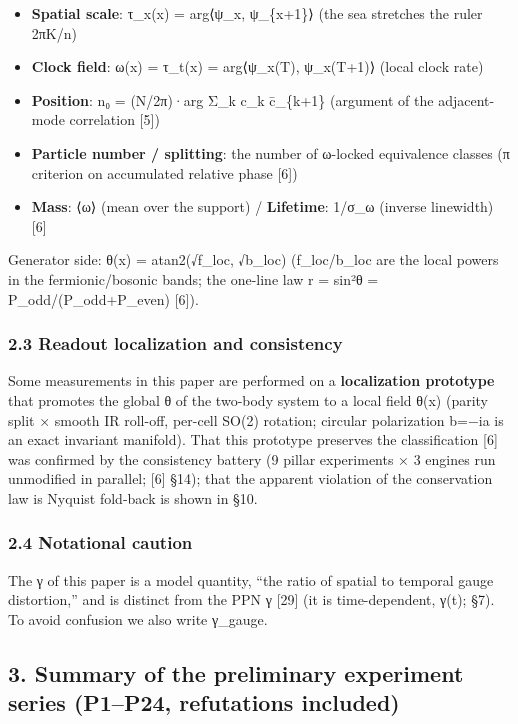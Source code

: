 \documentclass[
]{article}
\providecommand{\tightlist}{%
  \setlength{\itemsep}{0pt}\setlength{\parskip}{0pt}}
\begin{document}
\begin{itemize}
\tightlist
\item
  \textbf{Spatial scale}: τ\_x(x) = arg⟨ψ\_x, ψ\_\{x+1\}⟩ (the sea
  stretches the ruler 2πK/n)
\item
  \textbf{Clock field}: ω(x) = τ\_t(x) = arg⟨ψ\_x(T), ψ\_x(T+1)⟩ (local
  clock rate)
\item
  \textbf{Position}: n₀ = (N/2π)·arg Σ\_k c\_k c̄\_\{k+1\} (argument of
  the adjacent-mode correlation {[}5{]})
\item
  \textbf{Particle number / splitting}: the number of ω-locked
  equivalence classes (π criterion on accumulated relative phase
  {[}6{]})
\item
  \textbf{Mass}: ⟨ω⟩ (mean over the support) / \textbf{Lifetime}: 1/σ\_ω
  (inverse linewidth) {[}6{]}
\end{itemize}

Generator side: θ(x) = atan2(√f\_loc, √b\_loc) (f\_loc/b\_loc are the
local powers in the fermionic/bosonic bands; the one-line law r = sin²θ
= P\_odd/(P\_odd+P\_even) {[}6{]}).

\subsubsection{2.3 Readout localization and
consistency}\label{readout-localization-and-consistency}

Some measurements in this paper are performed on a \textbf{localization
prototype} that promotes the global θ of the two-body system to a local
field θ(x) (parity split × smooth IR roll-off, per-cell SO(2) rotation;
circular polarization b=−ia is an exact invariant manifold). That this
prototype preserves the classification {[}6{]} was confirmed by the
consistency battery (9 pillar experiments × 3 engines run unmodified in
parallel; {[}6{]} §14); that the apparent violation of the conservation
law is Nyquist fold-back is shown in §10.

\subsubsection{2.4 Notational caution}\label{notational-caution}

The γ of this paper is a model quantity, ``the ratio of spatial to
temporal gauge distortion,'' and is distinct from the PPN γ {[}29{]} (it
is time-dependent, γ(t); §7). To avoid confusion we also write γ\_gauge.

\subsection{3. Summary of the preliminary experiment series (P1--P24,
refutations
included)}\label{summary-of-the-preliminary-experiment-series-p1p24-refutations-included}
\end{document}
